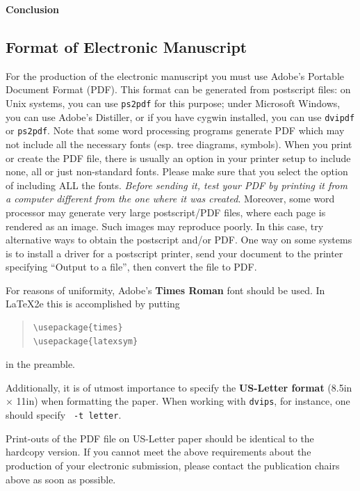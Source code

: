 \documentclass[11pt,letterpaper]{article}
\begin{document}
{\bf Conclusion} \\

\subsection{Format of Electronic Manuscript}
\label{sect:pdf}

For the production of the electronic manuscript you must use Adobe's
Portable Document Format (PDF). This format can be generated from
postscript files: on Unix systems, you can use {\tt ps2pdf} for this
purpose; under Microsoft Windows, you can use Adobe's Distiller, or
if you have cygwin installed, you can use {\tt dvipdf} or
{\tt ps2pdf}.  Note 
that some word processing programs generate PDF which may not include
all the necessary fonts (esp. tree diagrams, symbols). When you print
or create the PDF file, there is usually an option in your printer
setup to include none, all or just non-standard fonts.  Please make
sure that you select the option of including ALL the fonts.  {\em
  Before sending it, test your {\/\em PDF} by printing it from a
  computer different from the one where it was created}. Moreover,
some word processor may generate very large postscript/PDF files,
where each page is rendered as an image. Such images may reproduce
poorly.  In this case, try alternative ways to obtain the postscript
and/or PDF.  One way on some systems is to install a driver for a
postscript printer, send your document to the printer specifying
``Output to a file'', then convert the file to PDF.

For reasons of uniformity, Adobe's {\bf Times Roman} font should be
used. In \LaTeX2e{} this is accomplished by putting

\begin{quote}
\begin{verbatim}
\usepackage{times}
\usepackage{latexsym}
\end{verbatim}
\end{quote}
in the preamble.

Additionally, it is of utmost importance to specify the {\bf
  US-Letter format} (8.5in $\times$ 11in) when formatting the paper.
When working with {\tt dvips}, for instance, one should specify {\tt
  -t letter}.

Print-outs of the PDF file on US-Letter paper should be identical to the
hardcopy version.  If you cannot meet the above requirements about the
production of your electronic submission, please contact the
publication chairs above  as soon as possible.
\end{document}
